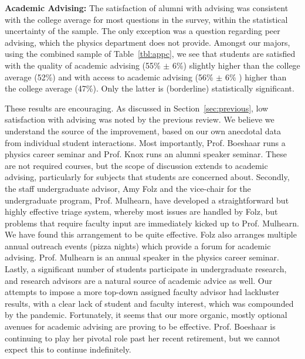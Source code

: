 \documentclass[12pt]{article}
\begin{document}
\noindent
{\bf Academic Advising:} The satisfaction of alumni with advising was
consistent with the college average for most questions in the survey, within the
statistical uncertainty of the sample.  The only exception was a
question regarding peer advising, which the physics department does
not provide.  Amongst our majors, using the combined sample of
Table~\ref{tbl:appc}, we see that students are satisfied with the
quality of academic advising (55\% $\pm$ 6\%) slightly higher than the
college average (52\%) and with access to academic advising (56\%
$\pm$ 6\% ) higher than the college average (47\%).  Only the latter
is (borderline) statistically significant.

These results are encouraging.  As discussed in
Section~\ref{sec:previous}, low satisfaction with advising was noted
by the previous review.  We believe we understand the source of the
improvement, based on our own anecdotal data from individual student
interactions.  Most importantly, Prof. Boeshaar runs a physics career
seminar and Prof. Knox runs an alumni speaker seminar.  These are not
required courses, but the scope of discussion extends to academic
advising, particularly for subjects that students are concerned about.
Secondly, the staff undergraduate advisor, Amy Folz and the vice-chair
for the undergraduate program, Prof. Mulhearn, have developed a
straightforward but highly effective triage system, whereby most
issues are handled by Folz, but problems that require faculty input are
immediately kicked up to Prof. Mulhearn.  We have found this
arrangement to be quite effective.  Folz also arranges multiple annual
outreach events (pizza nights) which provide a forum for academic
advising.  Prof. Mulhearn is an annual speaker in the physics career
seminar.  Lastly, a significant number of students participate in
undergraduate research, and research advisors are a natural source of
academic advice as well.  Our attempts to impose a more top-down
assigned faculty advisor had lackluster results, with a clear lack of
student and faculty interest, which was compounded by the pandemic.
Fortunately, it seems that our more organic, mostly optional avenues
for academic advising are proving to be effective.  Prof. Boeshaar is
continuing to play her pivotal role past her recent retirement, but we
cannot expect this to continue indefinitely.\\[3pt]
\end{document}
